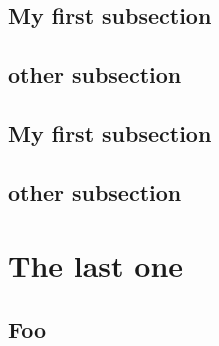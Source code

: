 \documentclass{book}
\begin{document}
\subsection{My first subsection}

\subsection{other subsection}


\subsection{My first subsection}

\subsection{other subsection}


\section{The last one}

\subsection{Foo}
\end{document}
